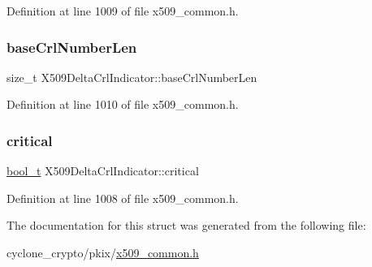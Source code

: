 Definition at line 1009 of file x509\+\_\+common.\+h.

\mbox{\label{structX509DeltaCrlIndicator_a0480df76b12e9bc47214eed6d60fed66}} 
\subsubsection{\texorpdfstring{base\+Crl\+Number\+Len}{baseCrlNumberLen}}
{\footnotesize\ttfamily size\+\_\+t X509\+Delta\+Crl\+Indicator\+::base\+Crl\+Number\+Len}



Definition at line 1010 of file x509\+\_\+common.\+h.

\mbox{\label{structX509DeltaCrlIndicator_a019a2a9523e49ff3fb04a3eafa033a8e}} 
\subsubsection{\texorpdfstring{critical}{critical}}
{\footnotesize\ttfamily \hyperlink{compiler__port_8h_a812d16e5494522586b3784e55d479912}{bool\+\_\+t} X509\+Delta\+Crl\+Indicator\+::critical}



Definition at line 1008 of file x509\+\_\+common.\+h.



The documentation for this struct was generated from the following file\+:\begin{DoxyCompactItemize}
\item 
cyclone\+\_\+crypto/pkix/\hyperlink{pkix_2x509__common_8h}{x509\+\_\+common.\+h}\end{DoxyCompactItemize}
